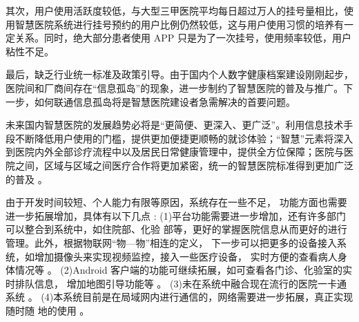 \documentclass[doctor,secret]{thuthesis}
\begin{document}
其次，用户使用活跃度较低，与大型三甲医院平均每日超过万人的挂号量相比，使用智慧医院系统进行挂号预约的用户比例仍然较低，这与用户使用习惯的培养有一定关系。同时，绝大部分患者使用 APP 只是为了一次挂号，使用频率较低，用户粘性不足。

最后，缺乏行业统一标准及政策引导。由于国内个人数字健康档案建设刚刚起步，医院间和厂商间存在“信息孤岛”的现象，进一步制约了智慧医院的普及与推广。下一步，如何联通信息孤岛将是智慧医院建设者急需解决的首要问题。

未来国内智慧医院的发展趋势必将是“更简便、更深入、更广泛”。利用信息技术手段不断降低用户使用的门槛，提供更加便捷更顺畅的就诊体验；“智慧”元素将深入到医院内外全部诊疗流程中以及居民日常健康管理中，提供全方位保障；医院与医院之间，区域与区域之间医疗合作将更加紧密，统一的智慧医院标准得到更加广泛的普及 \cite{_nfc_2016}。

由于开发时间较短、个人能力有限等原因，系统存在一些不足， 功能方面也需要进一步拓展增加，具体有以下几点 \cite{2016c}:
(1)平台功能需要进一步增加，还有许多部门可以整合到系统中，如住院部、化验 部等，更好的掌握医院信息从而更好的进行管理。此外，根据物联网“物—物”相连的定义， 下一步可以把更多的设备接入系统，如增加摄像头来实现视频监控，接入一些医疗设备， 实时方便的查看病人身体情况等 \cite{RN85}。
(2)Android 客户端的功能可继续拓展，如可查看各门诊、化验室的实时排队信息， 增加地图引导功能等 \cite{RN140}。
(3)未在系统中融合现在流行的医院一卡通系统 \cite{__2013}。
(4)本系统目前是在局域网内进行通信的，网络需要进一步拓展，真正实现随时随 地的使用 \cite{adame_cuidats:_nodate}。

\backmatter









\end{document}
